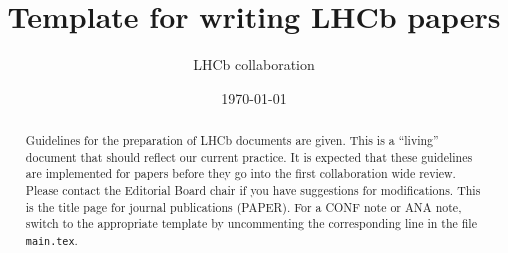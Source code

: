 \documentclass[%
 reprint,
 amsmath,amssymb,
 aps, prl
]{revtex4-1}
\def\maketitle{} %
\begin{document}

\title{Template for writing LHCb papers}

\author{LHCb collaboration}
%

\date{\today}%

\begin{abstract}
  Guidelines for the preparation of LHCb documents are given. This is
  a ``living'' document that should reflect our current practice. It
  is expected that these guidelines are implemented for papers
  before they go into the first collaboration wide review. Please
  contact the Editorial Board chair if you have suggestions for
  modifications.
  This is the title page for journal publications (PAPER).
  For a CONF note or ANA note, switch to the appropriate template 
  by uncommenting the corresponding line in the file \verb!main.tex!.  
\end{abstract}

\pacs{}%
\maketitle

















\begin{acknowledgments}

\end{acknowledgments}

%
{ 
  }
{}

\end{document}
